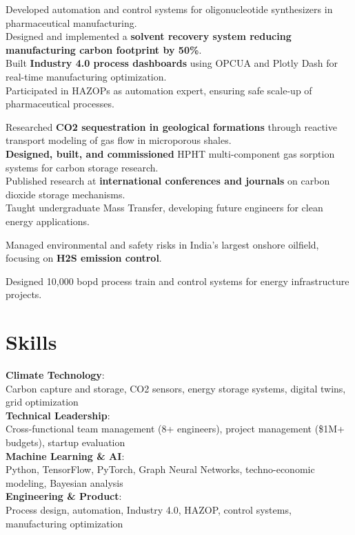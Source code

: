 \documentclass{../../templates/karthicv-single}
\begin{document}
{Developed automation and control systems for oligonucleotide synthesizers in pharmaceutical manufacturing. \\
Designed and implemented a \textbf{solvent recovery system reducing manufacturing carbon footprint by 50\%}. \\
Built \textbf{Industry 4.0 process dashboards} using OPCUA and Plotly Dash for real-time manufacturing optimization. \\
Participated in HAZOPs as automation expert, ensuring safe scale-up of pharmaceutical processes.}

{Researched \textbf{CO2 sequestration in geological formations} through reactive transport modeling of gas flow in microporous shales. \\
\textbf{Designed, built, and commissioned} HPHT multi-component gas sorption systems for carbon storage research. \\
Published research at \textbf{international conferences and journals} on carbon dioxide storage mechanisms. \\
Taught undergraduate Mass Transfer, developing future engineers for clean energy applications.}

{Managed environmental and safety risks in India's largest onshore oilfield, focusing on \textbf{H2S emission control}.}

{Designed 10,000 bopd process train and control systems for energy infrastructure projects.}

\section{Skills}

\textbf{Climate Technology}: \\
Carbon capture and storage, CO2 sensors, energy storage systems, digital twins, grid optimization \\
\textbf{Technical Leadership}: \\
Cross-functional team management (8+ engineers), project management (\$1M+ budgets), startup evaluation \\
\textbf{Machine Learning \& AI}: \\
Python, TensorFlow, PyTorch, Graph Neural Networks, techno-economic modeling, Bayesian analysis \\
\textbf{Engineering \& Product}: \\
Process design, automation, Industry 4.0, HAZOP, control systems, manufacturing optimization \\
\end{document}
